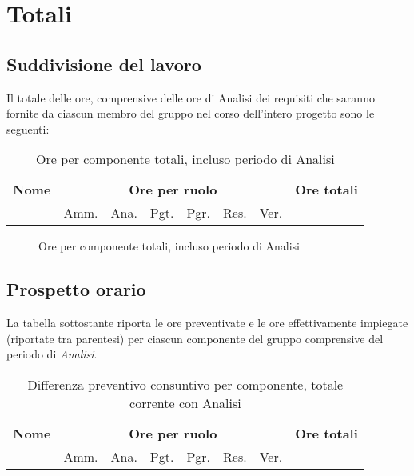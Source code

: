 \section{Totali}


	\subsection{Suddivisione del lavoro}

	Il totale delle ore, comprensive delle ore di Analisi dei requisiti che saranno fornite da ciascun membro del gruppo nel corso dell'intero progetto sono le seguenti:

	\begin{table}[H]
	\centering
	\begin{tabular}{lccccccc}
	\toprule 
	    \textbf{Nome}  & \multicolumn{6}{c}{\textbf{Ore per ruolo}} & \textbf{Ore totali}\\
	     & Amm. & Ana. & Pgt. & Pgr. & Res. & Ver. \\
	    \midrule
		
	    \bottomrule
	\end{tabular}
	\caption{Ore per componente totali, incluso periodo di Analisi}
	\end{table}


	\begin{figure}[H]
	\caption{Ore per componente totali, incluso periodo di Analisi}
	\end{figure}


	\subsection{Prospetto orario}

	La tabella sottostante riporta le ore preventivate e le ore effettivamente impiegate (riportate tra parentesi) per ciascun componente del gruppo \GroupName{} comprensive del periodo di \textit{Analisi}.

	\begin{center}
	\begin{table}[H]
	\begin{tabular}{lccccccc}
	\toprule
	    \textbf{Nome}  & \multicolumn{6}{c}{\textbf{Ore per ruolo}} & \textbf{Ore totali} \\
	     & Amm. & Ana. & Pgt. & Pgr. & Res. & Ver. & \\
	    \midrule
	    
	    \bottomrule
	\end{tabular}
	\caption{Differenza preventivo consuntivo per componente, totale corrente con Analisi}
	\end{table}
	\end{center}

